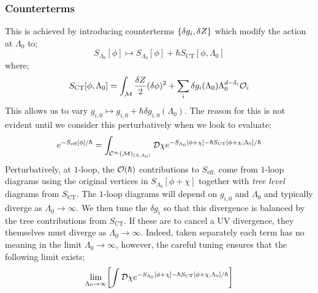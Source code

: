 \subsubsection{Counterterms}
This is achieved by introducing counterterms $\set{\delta g_i, \delta Z}$ which modify the action at $\Lambda_0$ to;
\begin{equation*}
S_{\Lambda_0}[\phi] \mapsto S_{\Lambda_0}[\phi] + \hbar S_{\text{CT}}[\phi, \Lambda_0]
\end{equation*}
where;
\begin{equation}
S_{\text{CT}}[\phi, \Lambda_0] = \int_{\mathcal{M}}{\frac{\delta Z}{2}(\delta \phi)^2 + \sum_{i}{\delta g_i(\Lambda_0)\Lambda_0^{d - \delta_i}\mathcal{O}_i}}
\end{equation}
This allows us to vary $g_{i, 0} \mapsto g_{i, 0} + \hbar \delta g_{i, 0}(\Lambda_0)$. The reason for this is not evident until we consider this perturbatively when we look to evaluate;
\begin{equation*}
e^{-S_{\text{eff}}[\phi]/\hbar} = \int_{\mathcal{C}^{\infty}(\mathcal{M})_{(\Lambda, \Lambda_0)}}{\mathcal{D}\chi e^{-S_{\Lambda_0}[\phi + \chi] - \hbar S_{\text{CT}}[\phi + \chi, \Lambda_0]/\hbar}}
\end{equation*}
Perturbatively, at $1$-loop, the $\mathcal{O}(\hbar)$ contributions to $S_{\text{eff.}}$ come from $1$-loop diagrams using the original vertices in $S_{\Lambda_0}[\phi + \chi]$ together with \emph{tree level} diagrams from $S_{\text{CT}}$. The $1$-loop diagrams will depend on $g_{i, 0}$ and $\Lambda_0$ and typically diverge as $\Lambda_0 \rightarrow \infty$. We then tune the $\delta g_i$ so that this divergence is balanced by the tree contributions from $S_{\text{CT}}$. If these are to cancel a UV divergence, they themselves must diverge as $\Lambda_0 \rightarrow \infty$. Indeed, taken separately each term has no meaning in the limit $\Lambda_0 \rightarrow \infty$, however, the careful tuning ensures that the following limit exists;
\begin{equation*}
\lim_{\Lambda_0 \rightarrow \infty}\left[\int{\mD \chi e^{-S_{\Lambda_0}[\phi + \chi] - \hbar S_{\text{CT}}[\phi + \chi, \Lambda_0]/\hbar}}\right]
\end{equation*}
